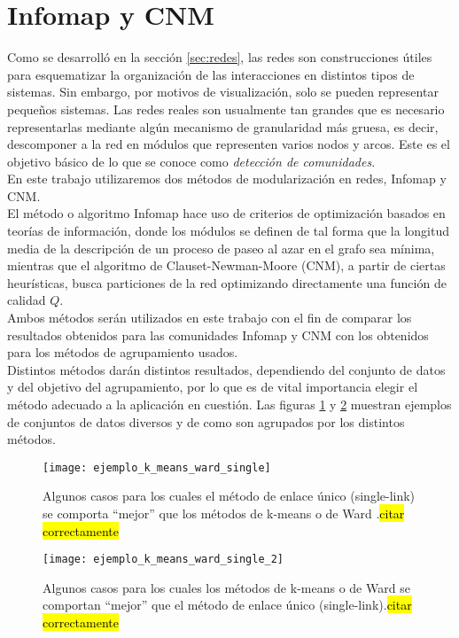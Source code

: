 \section{Infomap y CNM}
Como se desarrolló en la sección \ref{sec:redes}, las redes son construcciones útiles para esquematizar la organización de las interacciones en distintos tipos de sistemas. Sin embargo, por motivos de visualización, solo se pueden representar pequeños sistemas. Las redes reales son usualmente tan grandes que es necesario representarlas mediante algún mecanismo de granularidad más gruesa, es decir, descomponer a la red en módulos que representen varios nodos y arcos. Este es el objetivo básico de lo que se conoce como \textit{detección de comunidades}.\\
En este trabajo utilizaremos dos métodos de modularización en redes, Infomap y CNM.\\
El método o algoritmo Infomap hace uso de criterios de optimización basados en teorías de información, donde los módulos se definen de tal forma que la longitud media de la descripción de un proceso de paseo al azar en el grafo sea mínima, mientras que el algoritmo de Clauset-Newman-Moore (CNM), a partir de ciertas heurísticas, busca particiones de la red optimizando directamente una función de calidad $Q$.\\
Ambos métodos serán utilizados en este trabajo con el fin de comparar los resultados obtenidos para las comunidades Infomap y CNM con los obtenidos para los métodos de agrupamiento usados.\cite{Berenstein2014}\cite{Rosvall2008}\\
Distintos métodos darán distintos resultados, dependiendo del conjunto de datos y del objetivo del agrupamiento, por lo que es de vital importancia elegir el método adecuado a la aplicación en cuestión. Las figuras \ref{fig:ejemplo_k_means_ward_single} y \ref{fig:ejemplo_k_means_ward_single_2} muestran ejemplos de conjuntos de datos diversos y de como son agrupados por los distintos métodos.
\begin{figure}[h]
    \centering
    \texttt{[image: ejemplo\_k\_means\_ward\_single]}
    \caption{Algunos casos para los cuales el método de enlace único (single-link) se comporta ``mejor'' que los métodos de k-means o de Ward .\hl{citar correctamente}}
    \label{fig:ejemplo_k_means_ward_single}
\end{figure}

\begin{figure}[h]
    \centering
    \texttt{[image: ejemplo\_k\_means\_ward\_single\_2]}
    \caption{Algunos casos para los cuales los métodos de k-means o de Ward se comportan ``mejor'' que el método de enlace único (single-link).\hl{citar correctamente}}
    \label{fig:ejemplo_k_means_ward_single_2}
\end{figure}